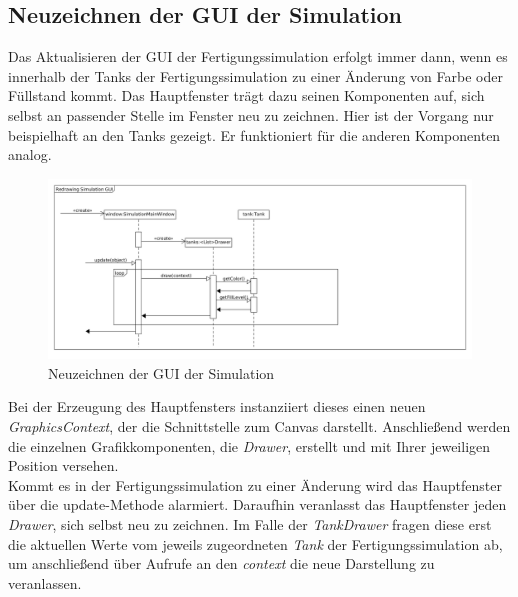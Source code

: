 \documentclass[parskip=full]{scrartcl}
\begin{document}
\subsection{Neuzeichnen der GUI der Simulation}
  Das Aktualisieren der GUI der Fertigungssimulation erfolgt immer dann, wenn es innerhalb der Tanks der Fertigungssimulation
  zu einer \"Anderung von Farbe oder F\"ullstand kommt. Das Hauptfenster tr\"agt dazu seinen Komponenten auf, sich selbst
  an passender Stelle im Fenster neu zu zeichnen. Hier ist der Vorgang nur beispielhaft an den Tanks gezeigt. Er funktioniert
  f\"ur die anderen Komponenten analog.
  \begin{figure}[H]
    \centering
    \includegraphics[scale=0.35]{design/sequence-diagrams/simulation-redraw.png}
    \caption{Neuzeichnen der GUI der Simulation}
  \end{figure}
  Bei der Erzeugung des Hauptfensters instanziiert dieses einen neuen \emph{GraphicsContext}, der die Schnittstelle zum Canvas darstellt.
  Anschlie{\ss}end werden die einzelnen Grafikkomponenten, die \emph{Drawer}, erstellt und mit Ihrer jeweiligen Position versehen.\\
  Kommt es in der Fertigungssimulation zu einer \"Anderung wird das Hauptfenster \"uber die update-Methode alarmiert. Daraufhin
  veranlasst das Hauptfenster jeden \emph{Drawer}, sich selbst neu zu zeichnen. Im Falle der \emph{TankDrawer} fragen diese erst die
  aktuellen Werte vom jeweils zugeordneten \emph{Tank} der Fertigungssimulation ab, um anschlie{\ss}end \"uber Aufrufe an den \emph{context}
  die neue Darstellung zu veranlassen.
\end{document}

